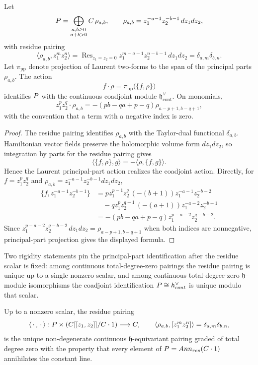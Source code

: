 \documentclass[11pt]{memoir}
\begin{document}
\begin{prop}\label{prop:principal-part-coadjoint}
  Let
  $$P=\bigoplus_{\substack{a,b\geq0\\a+b>0}}
    C\,\rho_{a,b},\qquad
    \rho_{a,b}=z_1^{-a-1}z_2^{-b-1}\,dz_1dz_2,$$
  with residue pairing
  $$\langle \rho_{a,b},z_1^mz_2^n\rangle
    =\operatorname{Res}_{z_1=z_2=0}
      z_1^{m-a-1}z_2^{n-b-1}\,dz_1dz_2
    =\delta_{a,m}\delta_{b,n}.$$
  Let $\pi_{\mathrm{pp}}$ denote projection of Laurent two-forms to the span of
  the principal parts $\rho_{a,b}$. The action
  $$f\cdot\rho=\pi_{\mathrm{pp}}\bigl(\{f,\rho\}\bigr)$$
  identifies $P$ with the continuous coadjoint module
  $\mathfrak h^\vee_{\mathrm{cont}}$. On monomials,
  $$z_1^pz_2^q\cdot\rho_{a,b}
    =-(pb-qa+p-q)\rho_{a-p+1,b-q+1},$$
  with the convention that a term with a negative index is zero.
\end{prop}

\begin{proof}
  The residue pairing identifies $\rho_{a,b}$ with the Taylor-dual functional
  $\delta_{a,b}$. Hamiltonian vector fields preserve the holomorphic volume
  form $dz_1dz_2$, so integration by parts for the residue pairing gives
  $$\langle \{f,\rho\},g\rangle=-\langle\rho,\{f,g\}\rangle.$$
  Hence the Laurent principal-part action realizes the coadjoint action.
  Directly, for $f=z_1^pz_2^q$ and
  $\rho_{a,b}=z_1^{-a-1}z_2^{-b-1}dz_1dz_2$,
  \begin{align*}
  \{f,z_1^{-a-1}z_2^{-b-1}\}
    &=p z_1^{p-1}z_2^q\,(-(b+1))z_1^{-a-1}z_2^{-b-2}\\
    &\quad
      -q z_1^pz_2^{q-1}\,(-(a+1))z_1^{-a-2}z_2^{-b-1}\\
    &=-(pb-qa+p-q)z_1^{p-a-2}z_2^{q-b-2}.
  \end{align*}
  Since
  $z_1^{p-a-2}z_2^{q-b-2}\,dz_1dz_2
    =\rho_{a-p+1,b-q+1}$ when both indices are nonnegative, principal-part
  projection gives the displayed formula.
\end{proof}

Two rigidity statements pin the principal-part identification after the
residue scalar is fixed: among continuous total-degree-zero pairings the
residue pairing is unique up to a single nonzero scalar, and among
continuous total-degree-zero \(\mathfrak h\)-module isomorphisms the
coadjoint identification
$P\cong h^\vee_{cont}$ is unique modulo that scalar.

\begin{thm}\label{thm:canonical-residue-pairing}
  Up to a nonzero scalar, the residue pairing
  $$\langle\,\cdot\,,\,\cdot\,\rangle:
    P\times(C[[z_1,z_2]]/C\cdot1)\longrightarrow C,\qquad
    \langle\rho_{a,b},[z_1^mz_2^n]\rangle=\delta_{a,m}\delta_{b,n},$$
  is the unique non-degenerate continuous $\mathfrak h$-equivariant
  pairing graded of total degree zero with the property that every element
  of $P=Ann_{res}(C\cdot1)$ annihilates the
  constant line.
\end{thm}
\end{document}
